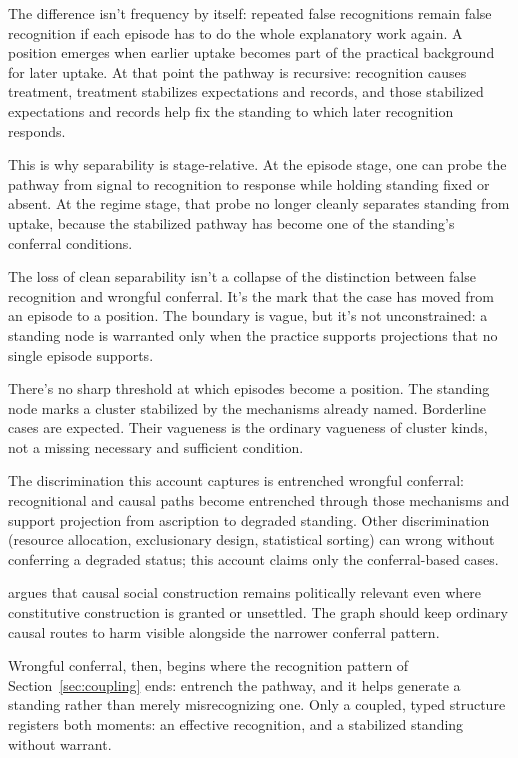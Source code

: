 \documentclass[12pt]{article}
\begin{document}
The difference isn't frequency by itself: repeated false recognitions remain false recognition if each episode has to do the whole explanatory work again. A position emerges when earlier uptake becomes part of the practical background for later uptake. At that point the pathway is recursive: recognition causes treatment, treatment stabilizes expectations and records, and those stabilized expectations and records help fix the standing to which later recognition responds.

This is why separability is stage-relative. At the episode stage, one can probe the pathway from signal to recognition to response while holding standing fixed or absent. At the regime stage, that probe no longer cleanly separates standing from uptake, because the stabilized pathway has become one of the standing's conferral conditions.

The loss of clean separability isn't a collapse of the distinction between false recognition and wrongful conferral. It's the mark that the case has moved from an episode to a position. The boundary is vague, but it's not unconstrained: a standing node is warranted only when the practice supports projections that no single episode supports.

There's no sharp threshold at which episodes become a position. The standing node marks a cluster stabilized by the mechanisms already named. Borderline cases are expected. Their vagueness is the ordinary vagueness of cluster kinds, not a missing necessary and sufficient condition.

The discrimination this account captures is entrenched wrongful conferral: recognitional and causal paths become entrenched through those mechanisms and support projection from ascription to degraded standing. Other discrimination (resource allocation, exclusionary design, statistical sorting) can wrong without conferring a degraded status; this account claims only the conferral-based cases.

\textcite[pp.~19--23]{marques2017CausalSocialConstruction} argues that causal social construction remains politically relevant even where constitutive construction is granted or unsettled. The graph should keep ordinary causal routes to harm visible alongside the narrower conferral pattern.

Wrongful conferral, then, begins where the recognition pattern of Section~\ref{sec:coupling} ends: entrench the pathway, and it helps generate a standing rather than merely misrecognizing one. Only a coupled, typed structure registers both moments: an effective recognition, and a stabilized standing without warrant.
\end{document}

